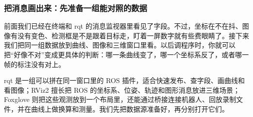 \subsubsection{把消息画出来：先准备一组能对照的数据}
\label{sec:ros2-visualization}

前面我们已经在终端和 rqt 的消息监视器里看见了字段。不过，坐标在不在抖、图像有没有变色、检测框是不是跟着目标走，盯着一屏数字就有些费眼睛了。接下来我们把同一组数据放到曲线、图像和三维窗口里看。以后调程序时，你就可以把“好像不对”变成更具体的判断：哪一条曲线变了，哪一个坐标系反了，或者哪一帧的标注没有对上。

rqt 是一组可以拼在同一窗口里的 ROS 插件，适合快速发布、查字段、画曲线和看图像；RViz2 擅长把 ROS 的坐标系、位姿、轨迹和图形消息放进三维场景；Foxglove 则把这些观测放到一个布局里，还能通过桥接连接机器人、回放录制文件，并在曲线上做换算和测量。我们先把数据源准备好，再分别打开它们。

